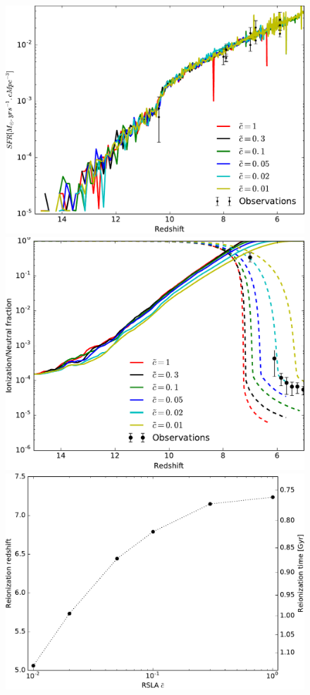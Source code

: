 \begin{figure}
        \includegraphics[height=.3\textheight]{img/04_mapreio/SFR.pdf} 
        \includegraphics[height=.3\textheight]{img/04_mapreio/xion.pdf} 
        \includegraphics[height=.3\textheight]{img/04_mapreio/z_rsla.pdf} 

\end{figure}
